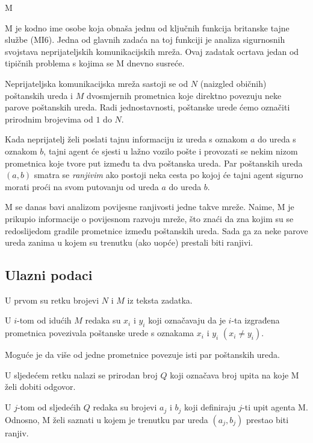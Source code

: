 \begin{statement}[
  problempoints=100,
  timelimit=1 sekunda,
  memorylimit=512 MiB,
]{M}

M je kodno ime osobe koja obnaša jednu od ključnih funkcija britanske tajne
službe (MI6). Jedna od glavnih zadaća na toj funkciji je analiza sigurnosnih
svojstava neprijateljskih komunikacijskih mreža. Ovaj zadatak ocrtava jedan
od tipičnih problema s kojima se M dnevno susreće.

Neprijateljska komunikacijska mreža sastoji se od $N$ (naizgled običnih)
poštanskih ureda i $M$ dvosmjernih prometnica koje direktno povezuju neke
parove poštanskih ureda. Radi jednostavnosti, poštanske urede ćemo označiti
prirodnim brojevima od $1$ do $N$.

Kada neprijatelj želi poslati tajnu informaciju iz ureda s oznakom $a$ do ureda
s oznakom $b$, tajni agent će sjesti u lažno vozilo pošte i provozati se
nekim nizom prometnica koje tvore put između ta dva poštanska ureda.  Par
poštanskih ureda $(a, b)$ smatra se \textit{ranjivim} ako postoji neka cesta
po kojoj će tajni agent sigurno morati proći na svom putovanju od ureda $a$
do ureda $b$.

M se danas bavi analizom povijesne ranjivosti jedne takve mreže. Naime, M je
prikupio informacije o povijesnom razvoju mreže, što znaći da zna kojim su se
redoslijedom gradile prometnice između poštanskih ureda. Sada ga za neke
parove ureda zanima u kojem su trenutku (ako uopće) prestali biti ranjivi.


\subsection*{Ulazni podaci}
U prvom su retku brojevi $N$ i $M$ iz teksta zadatka.

U $i$-tom od idućih $M$ redaka su $x_i$ i $y_i$ koji označavaju
da je $i$-ta izgrađena prometnica povezivala poštanske urede s oznakama $x_i$ i
$y_i$ $(x_i \ne y_i)$.

Moguće je da više od jedne prometnice povezuje isti par poštanskih ureda.

U sljedećem retku nalazi se prirodan broj $Q$ koji označava broj upita na koje
M želi dobiti odgovor.

U $j$-tom od sljedećih $Q$ redaka su brojevi $a_j$ i $b_j$ koji definiraju
$j$-ti upit agenta M. Odnosno, M želi saznati u kojem je trenutku par ureda
$(a_j, b_j)$ prestao biti ranjiv.


\end{statement}
